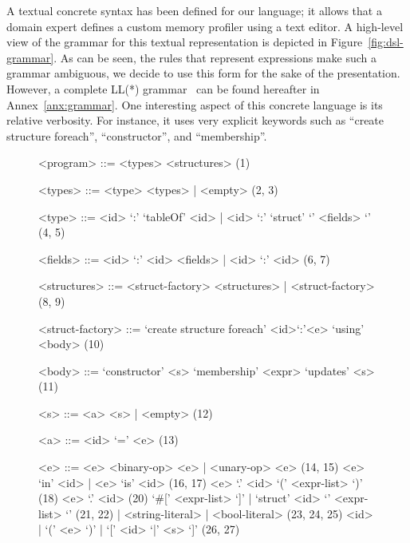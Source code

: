 A textual concrete syntax has been defined for our language; it allows that a domain expert defines a custom memory profiler using a text editor.
A high-level view of the grammar for this textual representation is depicted in Figure~\ref{fig:dsl-grammar}.
As can be seen, the rules that represent expressions make such a grammar ambiguous, we decide to use this form for the sake of the presentation.
However, a complete LL(*) grammar~\cite{Parr:2011:LFA:1993498.1993548} can be found hereafter in Annex~\ref{anx:grammar}.
One interesting aspect of this concrete language is its relative verbosity.
For instance, it uses very explicit keywords such as ``create structure foreach'', ``constructor'', and ``membership''.


{
\scriptsize
\begin{figure}[!ht]
\begin{mdframed}[outermargin=0.2cm, innermargin=0.5cm]

\newcommand{\grule}[1]{\hfill{\scriptsize (#1)}}
\setlength{\grammarindent}{5em}
\begin{grammar}

<program> ::= <types> <structures> \grule{1}

<types> ::= <type> <types> | <empty> \grule{2, 3}

<type> ::= <id> `:' `tableOf' <id> | <id> `:' `struct' `{' <fields> `}' \grule{4, 5}

<fields> ::= <id> `:' <id> <fields> | <id> `:' <id> \grule{6, 7}

<structures> ::= <struct-factory> <structures> | <struct-factory> \grule{8, 9}

<struct-factory> ::= `create structure foreach' <id>`:'<e> `using' <body> \grule{10}


<body> ::= `constructor' <s> `membership' <expr> `updates' <s> \grule{11}




<s> ::= <a> <s> | <empty> \grule{12}

<a> ::= <id> `=' <e>  \grule{13} 

<e> ::= <e> <binary-op> <e> | <unary-op> <e> \grule{14, 15}
\alt <e> `in' <id> | <e> `is' <id> \grule{16, 17}
\alt <e> `.' <id> `(' <expr-list> `)' \grule{18}
\alt <e> `.' <id>                              \grule{20}
\alt `#[' <expr-list> `]' | `struct' <id> `{' <expr-list> `}' \grule{21, 22}
 | <string-literal> | <bool-literal> \grule{23, 24, 25}
\alt <id> | `(' <e> `)' | `[' <id> `|' <s> `]' \grule{26, 27}


\end{grammar}
\end{mdframed}
\end{figure}}
